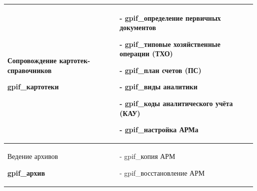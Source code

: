 \begin{table}[h!p]
\begin{tabular}{|p{8cm}|p{8cm}|}

Сопровождение картотек-справочников \par
\hspace{0pt} \par
\textbf{gpif\_картотеки}
&
- gpif\_определение первичных документов \par
- gpif\_типовые хозяйственные операции (ТХО) \par  
- gpif\_план счетов (ПС) \par
- gpif\_виды аналитики \par 
- gpif\_коды аналитического учёта (КАУ) \par
- gpif\_настройка АРМа
\\ \hline


Ведение архивов \par
\hspace{0pt} \par
\textbf{gpif\_архив}
&
- gpif\_копия АРМ \par
- gpif\_восстановление АРМ 
\\ \hline


    \end{tabular}
\end{table}

\newpage
